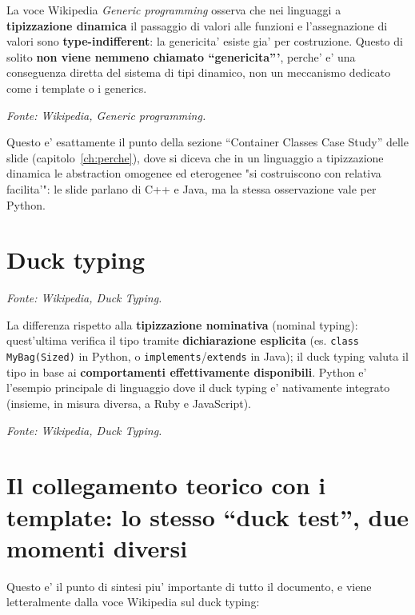 \documentclass{report}
\newcommand{\code}[1]{\texttt{\small #1}}
\newcommand{\fontewiki}[1][Template (C++)]{{\footnotesize\itshape\color{gray} Fonte: Wikipedia, \emph{#1}.\par}}
\begin{document}
La voce Wikipedia \emph{Generic programming} osserva che nei linguaggi a
\textbf{tipizzazione dinamica} il passaggio di valori alle funzioni e
l'assegnazione di valori sono \textbf{type-indifferent}: la genericita' esiste
gia' per costruzione. Questo di solito \textbf{non viene nemmeno chiamato
``genericita'''}, perche' e' una conseguenza diretta del sistema di tipi
dinamico, non un meccanismo dedicato come i template o i generics.

\fontewiki[Generic programming]

Questo e' esattamente il punto della sezione ``Container Classes Case
Study'' delle slide (capitolo~\ref{ch:perche}), dove si diceva che in un
linguaggio a tipizzazione dinamica le abstraction omogenee ed eterogenee "si
costruiscono con relativa facilita'": le slide parlano di C++ e Java, ma la
stessa osservazione vale per Python.

\section{Duck typing}


\fontewiki[Duck Typing]

La differenza rispetto alla \textbf{tipizzazione nominativa} (nominal
typing): quest'ultima verifica il tipo tramite \textbf{dichiarazione
esplicita} (es. \code{class MyBag(Sized)} in Python, o
\code{implements}/\code{extends} in Java); il duck typing valuta il tipo in
base ai \textbf{comportamenti effettivamente disponibili}. Python e'
l'esempio principale di linguaggio dove il duck typing e' nativamente
integrato (insieme, in misura diversa, a Ruby e JavaScript).

\fontewiki[Duck Typing]

\section{Il collegamento teorico con i template: lo stesso ``duck test'', due momenti diversi}

Questo e' il punto di sintesi piu' importante di tutto il documento, e viene
letteralmente dalla voce Wikipedia sul duck typing:
\end{document}
